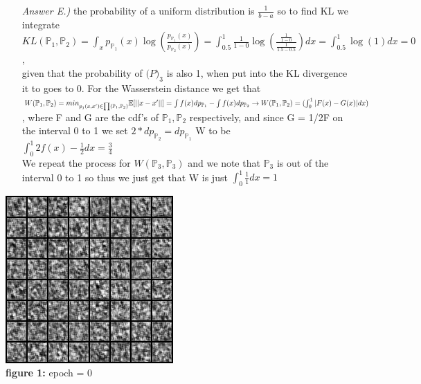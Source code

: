 \documentclass{article}
\theoremstyle{definition}
\theoremstyle{remark}
\begin{document}
\begin{enumerate}[font={\Large\bfseries}]
\begin{itemize}
			\item[\textit{Answer E.)}] the probability of a uniform distribution is $\frac{1}{b-a}$ so to find KL we integrate \\
			$KL(\mathbb{P}_1, \mathbb{P}_2) = \int_{x} p_{\mathbb{P}_1}(x) \log(\frac{p_{\mathbb{P}_1}(x)}{p_{\mathbb{P}_2}(x)}) = 
			\int_{0.5}^{1} \frac{1}{1-0} \log(\frac{ \frac{1}{1-0} }{ \frac{1}{1.5-0.5} })dx =
			\int_{0.5}^{1} \log(1)dx = 0$,\\
			given that the probability of $\mathbb(P)_3$ is also 1, when put into the KL divergence it to goes to 0. For the Wasserstein distance we get that\\
			$W(\mathbb{P}_1, \mathbb{P}_2) = min_{p_j(x,x') \in \prod(\mathbb{P}_1, \mathbb{P}_2)} \mathbb{E}[||x-x'||] = 
			\int f(x) dp_{\mathbb{P}_1}  -\int f(x) dp_{\mathbb{P}_2} \rightarrow\\ 
			W(\mathbb{P}_1, \mathbb{P}_2) = (\int_{0}^{1} |F(x) - G(x)| dx)$, where F and G are the cdf's of $\mathbb{P}_1, \mathbb{P}_2$ respectively, and since 
			G = 1/2F on the interval 0 to 1 we set $2*dp_{\mathbb{P}_2} = dp_{\mathbb{P}_1}$ W to be \\
			$\int_{0}^{1} 2 f(x)-\frac{1}{2} dx = \frac{3}{4}$\\
			We repeat the process for $W(\mathbb{P}_3,\mathbb{P}_3)$ and we note that $\mathbb{P}_3$ is out of the interval 0 to 1 so thus we just get that W is
			just $\int_{0}^{1} \frac{1}{1} dx = 1$

		\end{itemize}
		
		        
		\begin{center}
			
			\includegraphics[scale=0.9]{test_0.png}\\
			\textbf{figure 1:} epoch = 0\\


\end{center}
\end{enumerate}
\end{document}
